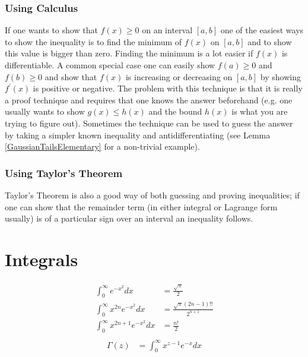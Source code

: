 \documentclass{amsbook}
\theoremstyle{definition}
\theoremstyle{remark}
\begin{document}
\subsection{Using Calculus}
If one wants to show that $f(x) \geq 0$ on an interval $[a,b]$ one of
the easiest ways to show the inequality is to find the minimum of
$f(x)$ on $[a,b]$ and to show this value is bigger than zero.  Finding
the minimum is a lot easier if $f(x)$ is differentiable.  A common
special case one can easily show $f(a) \geq 0$ and $f(b) \geq
0$ and show that $f(x)$ is increasing or decreasing on $[a,b]$ by
showing $f^{\prime}(x)$ is positive or negative.  The problem with
this technique is that it is really a proof technique and requires
that one knows the answer beforehand (e.g. one usually wants to show
$g(x) \leq h(x)$ and the bound $h(x)$ is what you are trying to figure
out).  Sometimes the technique can be
used to guess the answer by taking a simpler known inequality and
antidifferentiating (see Lemma \ref{GaussianTailsElementary} for a
non-trivial example).

\subsection{Using Taylor's Theorem}
Taylor's Theorem is also a good way of both guessing and proving
inequalities; if one can show that the remainder term (in either
integral or Lagrange form usually) is of a particular sign over an
interval an inequality follows.  

\chapter{Integrals}
\begin{align*}
\int_0^\infty e^{-x^2} dx &= \frac{\sqrt{\pi}}{2} \\
\int_0^\infty x^{2n} e^{-x^2} dx &= \frac{\sqrt{\pi} \left(2n-1\right)!!}{2^{n+1}} \\
\int_0^\infty x^{2n+1} e^{-x^2} dx &= \frac{n!}{2}\\
\end{align*}
\begin{align*}
\Gamma(z) &= \int_0^\infty x^{z-1} e^{-x} dx
\end{align*}
\end{document}
